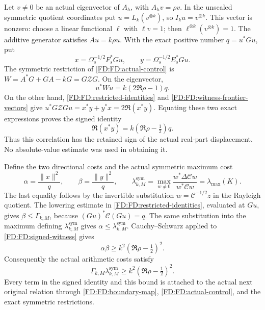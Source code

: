 Let \(v\ne0\) be an actual eigenvector of \(A_h\), with
\(A_hv=\rho v\).  In the unscaled symmetric quotient coordinates put
\(u=L_k(v^{\otimes k})\), so \(I_ku=v^{\otimes k}\).
This vector is nonzero: choose a linear functional \(\ell\) with
\(\ell v=1\); then \(\ell^{\otimes k}(v^{\otimes k})=1\).
The additive generator satisfies \(Au=k\rho u\).  With the exact
positive number \(q=u^*Gu\), put
\begin{equation}
x=\Omega_s^{-1/2}F_s^*Gu,\qquad
y=\Omega_s^{-1/2}E_s^*Gu.
\tag{FD.41}\label{FD:FD:witness-frontier-vectors}
\end{equation}
The symmetric restriction of \eqref{FD:FD:actual-control} is
\(W=A^*G+GA-kG=G\mathcal ZG\).  On the eigenvector,
\[
u^*Wu=k(2\Re\rho-1)q.
\]
On the other hand, \eqref{FD:FD:restricted-identities} and
\eqref{FD:FD:witness-frontier-vectors} give
\(u^*G\mathcal ZGu=x^*y+y^*x=2\Re(x^*y)\).
Equating these two exact expressions proves the signed identity
\begin{equation}
\boxed{\Re(x^*y)=k(\Re\rho-\tfrac12)q.}
\tag{FD.42}\label{FD:FD:signed-witness}
\end{equation}
Thus this correlation has the retained sign of the actual real-part
displacement.  No absolute-value estimate was used in obtaining it.

Define the two directional costs and the actual symmetric maximum cost
\begin{equation}
\alpha=\frac{\|x\|^2}{q},\qquad
\beta=\frac{\|y\|^2}{q},\qquad
\lambda_{k,M}^{\mathrm{sym}}
=\max_{w\ne0}\frac{w^*\Delta\mathcal Cw}{w^*\mathcal Cw}
=\lambda_{\max}(K).
\tag{FD.43}\label{FD:FD:relative-costs}
\end{equation}
The last equality follows by the invertible substitution
\(w=\mathcal C^{-1/2}z\) in the Rayleigh quotient.  The lowering
estimate in \eqref{FD:FD:restricted-identities}, evaluated at \(Gu\),
gives \(\beta\le\Gamma_{k,M}\), because
\((Gu)^*\mathcal C(Gu)=q\).  The same substitution into the
maximum defining \(\lambda_{k,M}^{\mathrm{sym}}\) gives
\(\alpha\le\lambda_{k,M}^{\mathrm{sym}}\).  Cauchy--Schwarz applied
to \eqref{FD:FD:signed-witness} gives
\[
\alpha\beta\ge k^2(\Re\rho-\tfrac12)^2.
\]
Consequently the actual arithmetic costs satisfy
\begin{equation}
\boxed{\Gamma_{k,M}\lambda_{k,M}^{\mathrm{sym}}
\ge k^2(\Re\rho-\tfrac12)^2.}
\tag{FD.44}\label{FD:FD:quadratic-cost}
\end{equation}
Every term in the signed identity and this bound is attached to the
actual next original relation through \eqref{FD:FD:boundary-map},
\eqref{FD:FD:actual-control}, and the exact symmetric restrictions.

